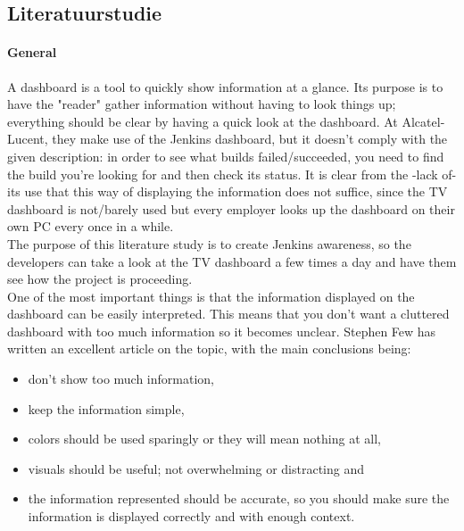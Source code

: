 \documentclass[10pt,a4paper]{article}
\begin{document}
\clearpage



\begin{appendices}
\section{Literatuurstudie}
\label{lit_study}


\paragraph{General}
A dashboard is a tool to quickly show information at a glance. Its purpose is to have the "reader" gather information without having to look things up; everything should be clear by having a quick look at the dashboard. At Alcatel-Lucent, they make use of the Jenkins dashboard, but it doesn't comply with the given description: in order to see what builds failed/succeeded, you need to find the build you're looking for and then check its status. It is clear from the -lack of- its use that this way of displaying the information does not suffice, since the TV dashboard is not/barely used but every employer looks up the dashboard on their own PC every once in a while. \\

The purpose of this literature study is to create Jenkins awareness, so the developers can take a look at the TV dashboard a few times a day and have them see how the project is proceeding.\\
One of the most important things is that the information displayed on the dashboard can be easily interpreted. This means that you don't want a cluttered dashboard with too much information so it becomes unclear.
Stephen Few has written an excellent article on the topic, with the main conclusions being:
\begin{itemize}
\item don't show too much information,
\item keep the information simple,
\item colors should be used sparingly or they will mean nothing at all,
\item visuals should be useful; not overwhelming or distracting and
\item the information represented should be accurate, so you should make sure the information is displayed correctly and with enough context.
\end{itemize}
 

\end{appendices}
\end{document}
